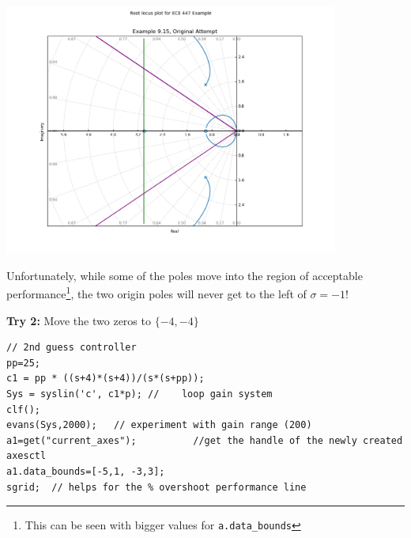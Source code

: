 \begin{ExampleCont}

\begin{center}
\includegraphics[width=110mm]{figs09/R15J18.png}
\end{center}

Unfortunately, while some of the poles move into the region of acceptable performance\footnote{This can be seen with bigger values for {\tt a.data\_bounds}},
the two origin poles will never get to the left of $\sigma = -1$!

\vspace{0.2in}
{\bf Try 2: } Move the two zeros to $\{-4,-4\}$
\begin{verbatim}
// 2nd guess controller
pp=25;
c1 = pp * ((s+4)*(s+4))/(s*(s+pp));
Sys = syslin('c', c1*p); //    loop gain system
clf();
evans(Sys,2000);   // experiment with gain range (200)
a1=get("current_axes");          //get the handle of the newly created axesctl
a1.data_bounds=[-5,1, -3,3];
sgrid;  // helps for the % overshoot performance line
\end{verbatim}

\end{ExampleCont}

